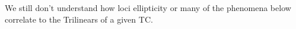 We still don't understand how loci ellipticity or many of the phenomena below correlate to the Trilinears of a given TC.



